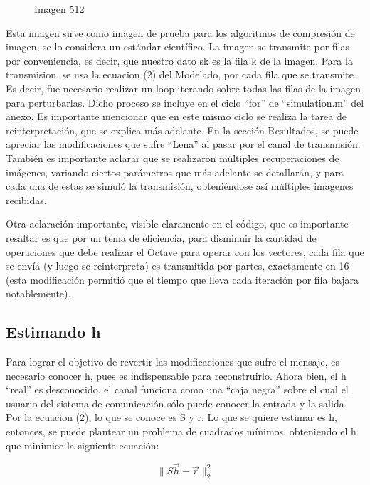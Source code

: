 \documentclass{article}
\begin{document}
\begin{multicols}{2}
\begin{figure}[H]
\caption{Imagen 512}
\label{Imagen 512}
\end{figure}
\par Esta imagen sirve como imagen de prueba para los algoritmos de compresión de imagen, se lo considera un estándar científico. La imagen se transmite por filas por conveniencia, es decir, que nuestro dato sk es la fila k de la imagen. Para la transmision, se usa la ecuacion (2) del Modelado, por cada fila que se transmite. Es decir, fue necesario realizar un loop iterando sobre todas las filas de la imagen para perturbarlas. Dicho proceso se incluye en el ciclo “for” de “simulation.m” del anexo. Es importante mencionar que en este mismo ciclo se realiza la tarea de reinterpretación, que se explica más adelante. En la sección Resultados, se puede apreciar las modificaciones que sufre “Lena” al pasar por el canal de transmisión. También es importante aclarar que se realizaron múltiples recuperaciones de imágenes, variando ciertos parámetros que más adelante se detallarán, y para cada una de estas se simuló la transmisión, obteniéndose así múltiples imagenes recibidas.
\par Otra aclaración importante, visible claramente en el código, que es importante resaltar es que por un tema de eficiencia, para disminuir la cantidad de operaciones que debe realizar el Octave para operar con los vectores, cada fila que se envía (y luego se reinterpreta) es transmitida por partes, exactamente en 16 (esta modificación permitió que el tiempo que lleva cada iteración por fila bajara notablemente).  


\subsection{Estimando h}
\label{sec3}

\par Para lograr el objetivo de revertir las modificaciones que sufre el mensaje, es necesario conocer h, pues es indispensable para reconstruirlo. Ahora bien, el h “real” es desconocido, el canal funciona como una “caja negra” sobre el cual el usuario del sistema de comunicación sólo puede conocer la entrada y la salida. Por la ecuacion (2), lo que se conoce es S y r. Lo que se quiere estimar es h, entonces, se puede plantear un problema de cuadrados mínimos, obteniendo el h que minimice la siguiente ecuación:

\begin{equation}
\label{eq4}
\| S\vec{h} -\vec{r}\|_2^2
\end{equation}


\end{multicols}
\end{document}
